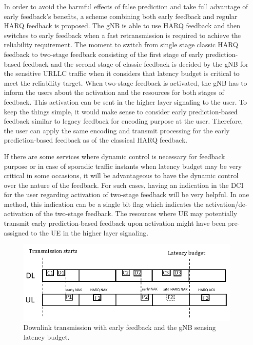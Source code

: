 \documentclass[conference]{IEEEtran}
\begin{document}
In order to avoid the harmful effects of false prediction and take full advantage of early feedback's benefits, a scheme combining both early feedback and regular HARQ feedback is proposed. The gNB is able to use HARQ feedback and then switches to early feedback when a fast retransmission is required to achieve the reliability requirement. The moment to switch from single stage classic HARQ feedback to two-stage feedback consisting of the first stage of early prediction-based feedback and the second stage of classic feedback is decided by the gNB for the sensitive URLLC traffic when it considers that latency budget is critical to meet the reliability target. When two-stage feedback is activated, the gNB has to inform the users about the activation and the resources for both stages of feedback. This activation can be sent in the higher layer signaling to the user. To keep the things simple, it would make sense to consider early prediction-based feedback similar to legacy feedback for encoding purpose at the user. Therefore, the user can apply the same encoding and transmit processing for the early prediction-based feedback as of the classical HARQ feedback.

If there are some services where dynamic control is necessary for feedback purpose or in case of sporadic traffic instants when latency budget may be very critical in some occasions, it will be advantageous to have the dynamic control over the nature of the feedback. For such cases, having an indication in the DCI for the user regarding activation of two-stage feedback will be very helpful. In one method, this indication can be a single bit flag which indicates the activation/de-activation of the two-stage feedback. The resources where UE may potentially transmit early prediction-based feedback upon activation might have been pre-assigned to the UE in the higher layer signaling.

\begin{figure}[htbp]
\centerline{\includegraphics[scale=0.38]{fig4.png}}
\caption{Downlink transmission with early feedback and the gNB sensing latency budget.}
\label{fig4}
\end{figure}
\end{document}
